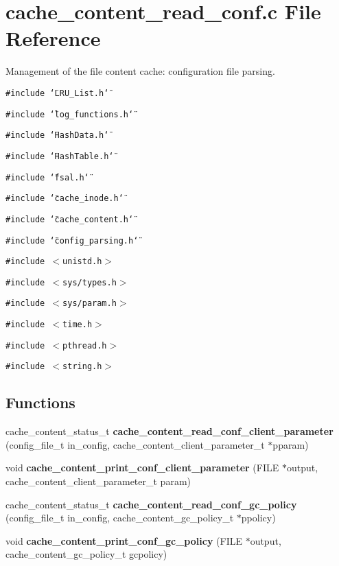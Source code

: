 \section{cache\_\-content\_\-read\_\-conf.c File Reference}
\label{cache__content__read__conf_8c}
Management of the file content cache: configuration file parsing. 

{\tt \#include \char`\"{}LRU\_\-List.h\char`\"{}}\par
{\tt \#include \char`\"{}log\_\-functions.h\char`\"{}}\par
{\tt \#include \char`\"{}Hash\-Data.h\char`\"{}}\par
{\tt \#include \char`\"{}Hash\-Table.h\char`\"{}}\par
{\tt \#include \char`\"{}fsal.h\char`\"{}}\par
{\tt \#include \char`\"{}cache\_\-inode.h\char`\"{}}\par
{\tt \#include \char`\"{}cache\_\-content.h\char`\"{}}\par
{\tt \#include \char`\"{}config\_\-parsing.h\char`\"{}}\par
{\tt \#include $<$unistd.h$>$}\par
{\tt \#include $<$sys/types.h$>$}\par
{\tt \#include $<$sys/param.h$>$}\par
{\tt \#include $<$time.h$>$}\par
{\tt \#include $<$pthread.h$>$}\par
{\tt \#include $<$string.h$>$}\par
\subsection*{Functions}
\begin{CompactItemize}
\item 
cache\_\-content\_\-status\_\-t {\bf cache\_\-content\_\-read\_\-conf\_\-client\_\-parameter} (config\_\-file\_\-t in\_\-config, cache\_\-content\_\-client\_\-parameter\_\-t $\ast$pparam)
\item 
void {\bf cache\_\-content\_\-print\_\-conf\_\-client\_\-parameter} (FILE $\ast$output, cache\_\-content\_\-client\_\-parameter\_\-t param)
\item 
cache\_\-content\_\-status\_\-t {\bf cache\_\-content\_\-read\_\-conf\_\-gc\_\-policy} (config\_\-file\_\-t in\_\-config, cache\_\-content\_\-gc\_\-policy\_\-t $\ast$ppolicy)
\item 
void {\bf cache\_\-content\_\-print\_\-conf\_\-gc\_\-policy} (FILE $\ast$output, cache\_\-content\_\-gc\_\-policy\_\-t gcpolicy)
\end{CompactItemize}


